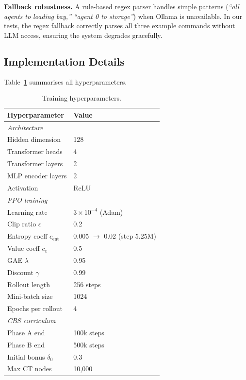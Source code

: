\documentclass[letterpaper,twocolumn,10pt]{article}
\begin{document}
\textbf{Fallback robustness.} A rule-based regex parser handles simple patterns
(\textit{``all agents to loading bay,''} \textit{``agent 0 to storage''}) when
Ollama is unavailable. In our tests, the regex fallback correctly parses all three
example commands without LLM access, ensuring the system degrades gracefully.

\subsection{Implementation Details}

Table~\ref{tab:hyperparams} summarises all hyperparameters.

\begin{table}[t]
\centering
\caption{Training hyperparameters.}
\label{tab:hyperparams}
\small
\begin{tabular}{ll}
\toprule
Hyperparameter & Value \\
\midrule
\multicolumn{2}{l}{\emph{Architecture}} \\
Hidden dimension         & 128 \\
Transformer heads        & 4 \\
Transformer layers       & 2 \\
MLP encoder layers       & 2 \\
Activation               & ReLU \\
\midrule
\multicolumn{2}{l}{\emph{PPO training}} \\
Learning rate            & $3\times 10^{-4}$ (Adam) \\
Clip ratio $\epsilon$    & 0.2 \\
Entropy coeff $c_\text{ent}$ & 0.005 $\to$ 0.02 (step 5.25M) \\
Value coeff $c_v$        & 0.5 \\
GAE $\lambda$            & 0.95 \\
Discount $\gamma$        & 0.99 \\
Rollout length           & 256 steps \\
Mini-batch size          & 1024 \\
Epochs per rollout       & 4 \\
\midrule
\multicolumn{2}{l}{\emph{CBS curriculum}} \\
Phase A end              & 100k steps \\
Phase B end              & 500k steps \\
Initial bonus $\delta_0$ & 0.3 \\
Max CT nodes             & 10,000 \\

\end{tabular}
\end{table}
\end{document}
